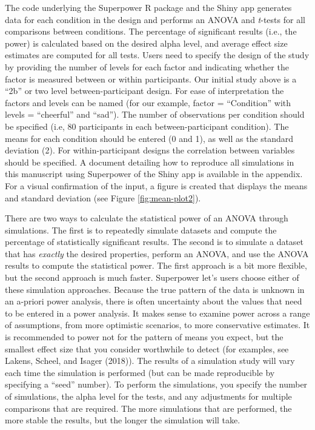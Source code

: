 \documentclass[
  ,jou,floatsintext]{apa6}
\begin{document}
The code underlying the Superpower R package and the Shiny app generates data for each condition in the design and performs an ANOVA and \emph{t}-tests for all comparisons between conditions.
The percentage of significant results (i.e., the power) is calculated based on the desired alpha level, and average effect size estimates are computed for all tests.
Users need to specify the design of the study by providing the number of levels for each factor and indicating whether the factor is measured between or within participants.
Our initial study above is a \enquote{2b} or two level between-participant design.
For ease of interpretation the factors and levels can be named (for our example, factor = \enquote{Condition} with levels = \enquote{cheerful} and \enquote{sad}).
The number of observations per condition should be specified (i.e, 80 participants in each between-participant condition).
The means for each condition should be entered (0 and 1), as well as the standard deviation (2).
For within-participant designs the correlation between variables should be specified.
A document detailing how to reproduce all simulations in this manuscript using Superpower of the Shiny app is available in the appendix.
For a visual confirmation of the input, a figure is created that displays the means and standard deviation (see Figure \ref{fig:mean-plot2}).

There are two ways to calculate the statistical power of an ANOVA through simulations.
The first is to repeatedly simulate datasets and compute the percentage of statistically significant results.
The second is to simulate a dataset that has \emph{exactly} the desired properties, perform an ANOVA, and use the ANOVA results to compute the statistical power.
The first approach is a bit more flexible, but the second approach is much faster.
Superpower let's users choose either of these simulation approaches.
Because the true pattern of the data is unknown in an a-priori power analysis, there is often uncertainty about the values that need to be entered in a power analysis.
It makes sense to examine power across a range of assumptions, from more optimistic scenarios, to more conservative estimates.
It is recommended to power not for the pattern of means you expect, but the smallest effect size that you consider worthwhile to detect (for examples, see Lakens, Scheel, and Isager (2018)).
The results of a simulation study will vary each time the simulation is performed (but can be made reproducible by specifying a \enquote{seed} number).
To perform the simulations, you specify the number of simulations, the alpha level for the tests, and any adjustments for multiple comparisons that are required.
The more simulations that are performed, the more stable the results, but the longer the simulation will take.
\end{document}
